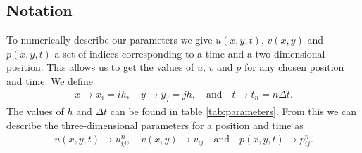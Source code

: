 \documentclass[english,notitlepage,reprint,nofootinbib]{revtex4-1}  %
\begin{document}
\subsection*{Notation}
To numerically describe our parameters we give $u(x,y,t)$, $v(x,y)$ and $p(x,y,t)$ a set of indices corresponding to a time and a two-dimensional position. This allows us to get the values of $u$, $v$ and $p$ for any chosen position and time. We define
\begin{align*}
    x \rightarrow x_i =ih, \quad y \rightarrow y_j =jh, \quad\text{and}\quad t \rightarrow  t_n =  n\Delta t.
\end{align*}
The values of $h$ and $\Delta t$ can be found in table \ref{tab:parameters}. From this we can describe the three-dimensional parameters for a position and time as
\begin{align*}
    u(x, y, t)  \rightarrow u_{ij}^n, \quad v(x, y) \rightarrow  v_{ij} \text{ }\text{ and }\text{ }  p(x, y, t) \rightarrow p_{ij}^n.
\end{align*}
\end{document}
